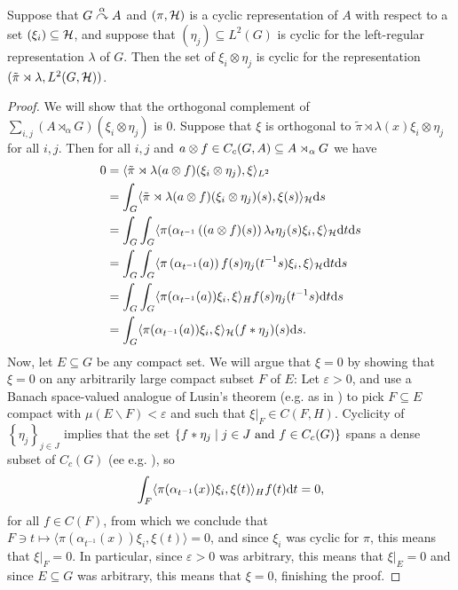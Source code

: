 \begin{lemma}
Suppose that $G \stackrel{\alpha}{\curvearrowright} A$ and $(\pi,\mathcal{H})$ is a cyclic representation of $A$ with respect to a set $(\xi_i) \subseteq \mathcal{H}$, and suppose that $(\eta_j) \subseteq L^2(G)$ is cyclic for the left-regular representation $\lambda$ of $G$. Then the set of $\xi_i \otimes \eta_j$ is cyclic for the representation $(\tilde \pi \rtimes \lambda, L^2(G,\mathcal{H}))$.
\label{mult:cyclic1}
\end{lemma}
\begin{proof}
We will show that the orthogonal complement of $\sum_{i,j} (A \rtimes_\alpha G)(\xi_i \otimes \eta_j)$ is $0$. Suppose that $\xi$ is orthogonal to $\tilde \pi \rtimes \lambda(x) \xi_i \otimes \eta_j$ for all $i,j$. Then for all $i,j$ and $a \otimes f \in C_c(G,A) \subseteq A \rtimes_\alpha G$ we have
\begin{align*}
	0 &= \langle \tilde \pi \rtimes \lambda (a \otimes f) (\xi_i \otimes \eta_j) , \xi \rangle_{L^2}\\
	&= \int_G \langle \tilde \pi \rtimes \lambda (a \otimes f) (\xi_i \otimes \eta_j)(s) , \xi(s)\rangle_{\mathcal{H}} \mathrm{d} s \\
	&= \int_G \int_G \langle \pi(\alpha_{t^{-1}}\left( (a \otimes f)(s) \right) \lambda_t \eta_j(s) \xi_i , \xi \rangle_{\mathcal{H}} \mathrm{d} t \mathrm{d} s\\
	&= \int_G \int_G \langle \pi\left( \alpha_{t^{-1}} (a) \right) f(s) \eta_j(t^{-1}s) \xi_i , \xi \rangle_{\mathcal{H}} \mathrm{d} t\mathrm{d} s\\
	&= \int_G \int_G \langle \pi( \alpha_{t^{-1}}(a) ) \xi_i , \xi \rangle_H f(s) \eta_j(t^{-1}s) \mathrm{d} t \mathrm{d} s \\
	&= \int_G \langle \pi(\alpha_{t^{-1}}(a)) \xi_i , \xi \rangle_{\mathcal{H}} (f \ast \eta_j)(s) \mathrm{d} s.
\end{align*}
Now, let $E \subseteq G$ be any compact set. We will argue that $\xi = 0$ by showing that $\xi = 0$ on any arbitrarily large compact subset $F$ of $E$: Let $\varepsilon > 0$, and use a Banach space-valued analogue of Lusin's theorem (e.g. as in \cite[Appendix B]{williamscrossed}) to pick $F \subseteq E$ compact with $\mu(E\backslash F) < \varepsilon$ and such that $\xi|_F \in C(F,H)$. Cyclicity of $\left\{ \eta_j \right\}_{j \in J}$ implies that the set $\{f \ast \eta_j \mid j \in J \text{ and } f \in C_c(G)\}$ spans a dense subset of $C_c(G)$ (ee e.g. \cite[Proposition 3.33]{folland2016fourier}), so
\begin{align*}
	\int_{F} \langle \pi(\alpha_{t^{-1}}(x)) \xi_i , \xi(t) \rangle_H f(t) \mathrm{d} t = 0,
\end{align*}
for all $f \in C(F)$, from which we conclude that $F \ni t \mapsto \langle \pi(\alpha_{t^{-1}}(x)) \xi_i , \xi(t) \rangle=0$, and since $\xi_i$ was cyclic for $\pi$, this means that $\xi|_F = 0$. In particular, since $\varepsilon > 0$ was arbitrary, this means that $\xi|_E = 0$ and since $E \subseteq G$ was arbitrary, this means that $\xi = 0$, finishing the proof.
\end{proof}

